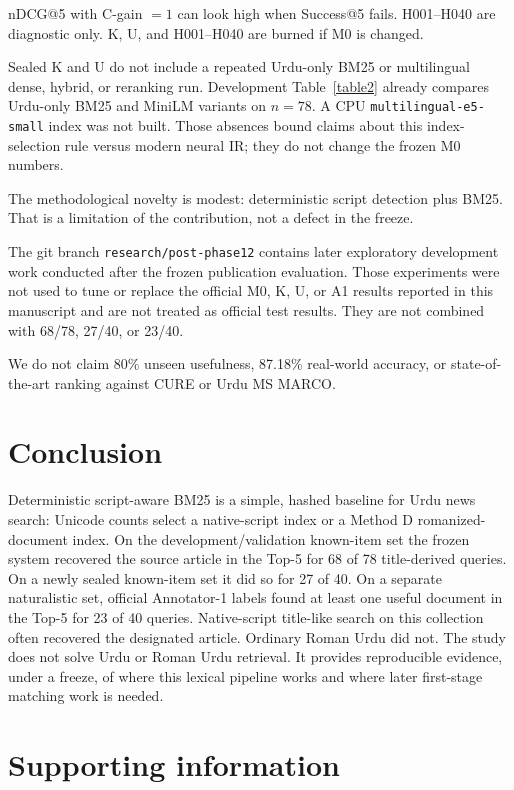 \documentclass[10pt,letterpaper]{article}
\begin{document}
nDCG@5 with C-gain $= 1$ can look high when Success@5 fails. H001--H040 are diagnostic only. K, U, and H001--H040 are burned if M0 is changed.

Sealed K and U do not include a repeated Urdu-only BM25 or multilingual dense, hybrid, or reranking run. Development Table~\ref{table2} already compares Urdu-only BM25 and MiniLM variants on $n = 78$. A CPU \texttt{multilingual-e5-small} index was not built. Those absences bound claims about this index-selection rule versus modern neural IR; they do not change the frozen M0 numbers.

The methodological novelty is modest: deterministic script detection plus BM25. That is a limitation of the contribution, not a defect in the freeze.

The git branch \texttt{research/post-phase12} contains later exploratory development work conducted after the frozen publication evaluation. Those experiments were not used to tune or replace the official M0, K, U, or A1 results reported in this manuscript and are not treated as official test results. They are not combined with 68/78, 27/40, or 23/40.

We do not claim 80\% unseen usefulness, 87.18\% real-world accuracy, or state-of-the-art ranking against CURE or Urdu MS MARCO.

\section*{Conclusion}

Deterministic script-aware BM25 is a simple, hashed baseline for Urdu news search: Unicode counts select a native-script index or a Method D romanized-document index. On the development/validation known-item set the frozen system recovered the source article in the Top-5 for 68 of 78 title-derived queries. On a newly sealed known-item set it did so for 27 of 40. On a separate naturalistic set, official Annotator-1 labels found at least one useful document in the Top-5 for 23 of 40 queries. Native-script title-like search on this collection often recovered the designated article. Ordinary Roman Urdu did not. The study does not solve Urdu or Roman Urdu retrieval. It provides reproducible evidence, under a freeze, of where this lexical pipeline works and where later first-stage matching work is needed.

\section*{Supporting information}
\end{document}

